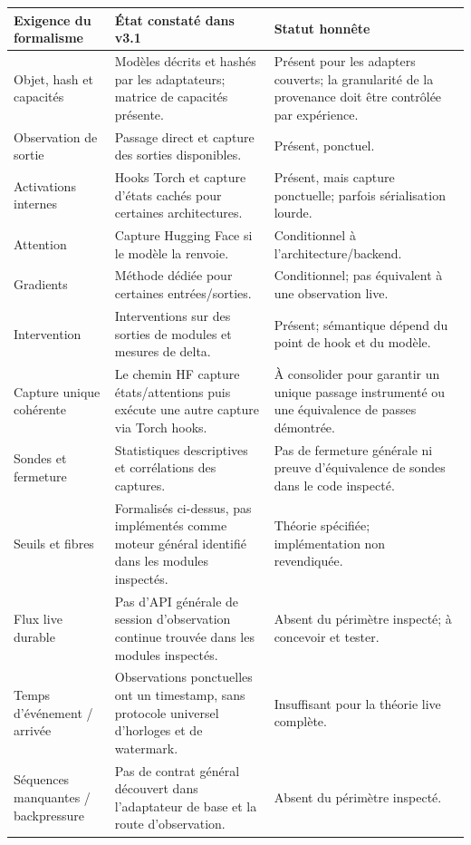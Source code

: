 \documentclass[11pt,oneside]{book}
\theoremstyle{definition}
\theoremstyle{remark}
\newcommand{\1}{\mathbf 1}
\begin{document}
\begin{longtable}{p{}p{}p{}}
\toprule
\textbf{Exigence du formalisme} & \textbf{État constaté dans v3.1} & \textbf{Statut honnête}\\
\midrule
\endhead
Objet, hash et capacités & Modèles décrits et hashés par les adaptateurs; matrice de capacités présente. & Présent pour les adapters couverts; la granularité de la provenance doit être contrôlée par expérience.\\
Observation de sortie & Passage direct et capture des sorties disponibles. & Présent, ponctuel.\\
Activations internes & Hooks Torch et capture d'états cachés pour certaines architectures. & Présent, mais capture ponctuelle; parfois sérialisation lourde.\\
Attention & Capture Hugging Face si le modèle la renvoie. & Conditionnel à l'architecture/backend.\\
Gradients & Méthode dédiée pour certaines entrées/sorties. & Conditionnel; pas équivalent à une observation live.\\
Intervention & Interventions sur des sorties de modules et mesures de delta. & Présent; sémantique dépend du point de hook et du modèle.\\
Capture unique cohérente & Le chemin HF capture états/attentions puis exécute une autre capture via Torch hooks. & À consolider pour garantir un unique passage instrumenté ou une équivalence de passes démontrée.\\
Sondes et fermeture & Statistiques descriptives et corrélations des captures. & Pas de fermeture générale ni preuve d'équivalence de sondes dans le code inspecté.\\
Seuils et fibres & Formalisés ci-dessus, pas implémentés comme moteur général identifié dans les modules inspectés. & Théorie spécifiée; implémentation non revendiquée.\\
Flux live durable & Pas d'API générale de session d'observation continue trouvée dans les modules inspectés. & Absent du périmètre inspecté; à concevoir et tester.\\
Temps d'événement / arrivée & Observations ponctuelles ont un timestamp, sans protocole universel d'horloges et de watermark. & Insuffisant pour la théorie live complète.\\
Séquences manquantes / backpressure & Pas de contrat général découvert dans l'adaptateur de base et la route d'observation. & Absent du périmètre inspecté.\\

\end{longtable}
\end{document}
